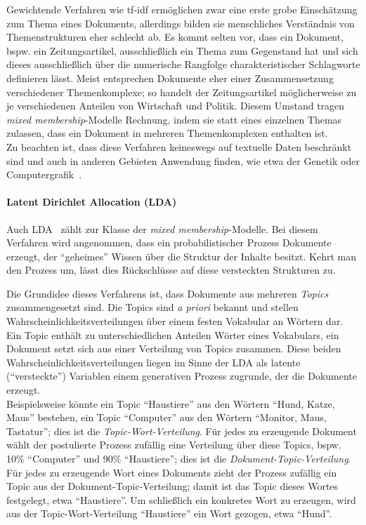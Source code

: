 \documentclass[11pt,a4paper,twoside]{article}
\let\oldpar\paragraph
\renewcommand{\paragraph}{\oldpar*}
\begin{document}
Gewichtende Verfahren wie tf-idf ermöglichen zwar eine erste grobe
Einschätzung zum Thema eines Dokuments, allerdings bilden sie
menschliches Verständnis von Themenstrukturen eher schlecht ab. Es kommt
selten vor, dass ein Dokument, bspw. ein Zeitungsartikel, ausschließlich
ein Thema zum Gegenstand hat und sich dieses ausschließlich über die
numerische Rangfolge charakteristischer Schlagworte definieren lässt.
Meist entsprechen Dokumente eher einer Zusammensetzung verschiedener
Themenkomplexe; so handelt der Zeitungsartikel möglicherweise zu je
verschiedenen Anteilen von Wirtschaft und Politik. Diesem Umstand tragen
\emph{mixed membership}-Modelle Rechnung, indem sie statt eines
einzelnen Themas zulassen, dass ein Dokument in mehreren Themenkomplexen
enthalten ist.\\
Zu beachten ist, dass diese Verfahren keineswegs auf textuelle Daten
beschränkt sind und auch in anderen Gebieten Anwendung finden, wie etwa
der Genetik oder Computergrafik~\autocite{Blei2012}.

\hypertarget{latent-dirichlet-allocation-lda}{%
\paragraph{Latent Dirichlet Allocation
(LDA)}\label{latent-dirichlet-allocation-lda}}

Auch LDA~\autocite{Blei2003} zählt zur Klasse der \emph{mixed
membership}-Modelle. Bei diesem Verfahren wird angenommen, dass ein
probabilistischer Prozess Dokumente erzeugt, der \enquote{geheimes}
Wissen über die Struktur der Inhalte besitzt. Kehrt man den Prozess um,
lässt dies Rückschlüsse auf diese versteckten Strukturen zu.

Die Grundidee dieses Verfahrens ist, dass Dokumente aus mehreren
\emph{Topics} zusammengesetzt sind. Die Topics sind \emph{a priori}
bekannt und stellen Wahrscheinlichkeitsverteilungen über einem festen
Vokabular an Wörtern dar. Ein Topic enthält zu unterschiedlichen
Anteilen Wörter eines Vokabulars, ein Dokument setzt sich aus einer
Verteilung von Topics zusammen. Diese beiden
Wahrscheinlichkeitsverteilungen liegen im Sinne der LDA als latente
(\enquote{versteckte}) Variablen einem generativen Prozess zugrunde, der
die Dokumente erzeugt.\\
Beispielsweise könnte ein Topic \enquote{Haustiere} aus den Wörtern
\enquote{Hund, Katze, Maus} bestehen, ein Topic \enquote{Computer} aus
den Wörtern \enquote{Monitor, Maus, Tastatur}; dies ist die
\emph{Topic-Wort-Verteilung}. Für jedes zu erzeugende Dokument wählt der
postulierte Prozess zufällig eine Verteilung über diese Topics, bspw.
10\% \enquote{Computer} und 90\% \enquote{Haustiere}; dies ist die
\emph{Dokument-Topic-Verteilung}. Für jedes zu erzeugende Wort eines
Dokuments zieht der Prozess zufällig ein Topic aus der
Dokument-Topic-Verteilung; damit ist das Topic dieses Wortes festgelegt,
etwa \enquote{Haustiere}. Um schließlich ein konkretes Wort zu erzeugen,
wird aus der Topic-Wort-Verteilung \enquote{Haustiere} ein Wort gezogen,
etwa \enquote{Hund}.
\end{document}
